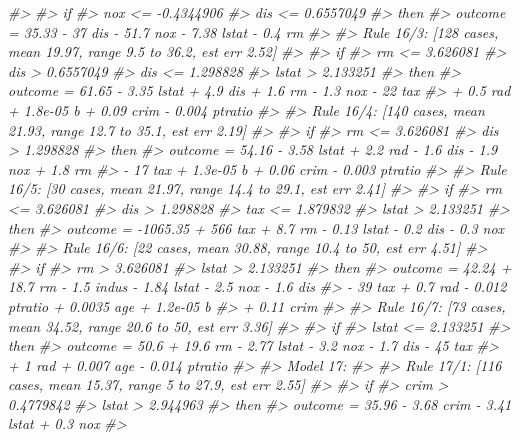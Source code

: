 \documentclass[]{book}
\newenvironment{Shaded}{\begin{snugshade}}{\end{snugshade}}
\newcommand{\CommentTok}[1]{\textcolor[rgb]{0.56,0.35,0.01}{\textit{#1}}}
\begin{document}
\begin{Shaded}
\begin{Highlighting}[]
\CommentTok{#> }
\CommentTok{#>     if}
\CommentTok{#>  nox <= -0.4344906}
\CommentTok{#>  dis <= 0.6557049}
\CommentTok{#>     then}
\CommentTok{#>  outcome = 35.33 - 37 dis - 51.7 nox - 7.38 lstat - 0.4 rm}
\CommentTok{#> }
\CommentTok{#>   Rule 16/3: [128 cases, mean 19.97, range 9.5 to 36.2, est err 2.52]}
\CommentTok{#> }
\CommentTok{#>     if}
\CommentTok{#>  rm <= 3.626081}
\CommentTok{#>  dis > 0.6557049}
\CommentTok{#>  dis <= 1.298828}
\CommentTok{#>  lstat > 2.133251}
\CommentTok{#>     then}
\CommentTok{#>  outcome = 61.65 - 3.35 lstat + 4.9 dis + 1.6 rm - 1.3 nox - 22 tax}
\CommentTok{#>            + 0.5 rad + 1.8e-05 b + 0.09 crim - 0.004 ptratio}
\CommentTok{#> }
\CommentTok{#>   Rule 16/4: [140 cases, mean 21.93, range 12.7 to 35.1, est err 2.19]}
\CommentTok{#> }
\CommentTok{#>     if}
\CommentTok{#>  rm <= 3.626081}
\CommentTok{#>  dis > 1.298828}
\CommentTok{#>     then}
\CommentTok{#>  outcome = 54.16 - 3.58 lstat + 2.2 rad - 1.6 dis - 1.9 nox + 1.8 rm}
\CommentTok{#>            - 17 tax + 1.3e-05 b + 0.06 crim - 0.003 ptratio}
\CommentTok{#> }
\CommentTok{#>   Rule 16/5: [30 cases, mean 21.97, range 14.4 to 29.1, est err 2.41]}
\CommentTok{#> }
\CommentTok{#>     if}
\CommentTok{#>  rm <= 3.626081}
\CommentTok{#>  dis > 1.298828}
\CommentTok{#>  tax <= 1.879832}
\CommentTok{#>  lstat > 2.133251}
\CommentTok{#>     then}
\CommentTok{#>  outcome = -1065.35 + 566 tax + 8.7 rm - 0.13 lstat - 0.2 dis - 0.3 nox}
\CommentTok{#> }
\CommentTok{#>   Rule 16/6: [22 cases, mean 30.88, range 10.4 to 50, est err 4.51]}
\CommentTok{#> }
\CommentTok{#>     if}
\CommentTok{#>  rm > 3.626081}
\CommentTok{#>  lstat > 2.133251}
\CommentTok{#>     then}
\CommentTok{#>  outcome = 42.24 + 18.7 rm - 1.5 indus - 1.84 lstat - 2.5 nox - 1.6 dis}
\CommentTok{#>            - 39 tax + 0.7 rad - 0.012 ptratio + 0.0035 age + 1.2e-05 b}
\CommentTok{#>            + 0.11 crim}
\CommentTok{#> }
\CommentTok{#>   Rule 16/7: [73 cases, mean 34.52, range 20.6 to 50, est err 3.36]}
\CommentTok{#> }
\CommentTok{#>     if}
\CommentTok{#>  lstat <= 2.133251}
\CommentTok{#>     then}
\CommentTok{#>  outcome = 50.6 + 19.6 rm - 2.77 lstat - 3.2 nox - 1.7 dis - 45 tax}
\CommentTok{#>            + 1 rad + 0.007 age - 0.014 ptratio}
\CommentTok{#> }
\CommentTok{#> Model 17:}
\CommentTok{#> }
\CommentTok{#>   Rule 17/1: [116 cases, mean 15.37, range 5 to 27.9, est err 2.55]}
\CommentTok{#> }
\CommentTok{#>     if}
\CommentTok{#>  crim > 0.4779842}
\CommentTok{#>  lstat > 2.944963}
\CommentTok{#>     then}
\CommentTok{#>  outcome = 35.96 - 3.68 crim - 3.41 lstat + 0.3 nox}
\CommentTok{#> }

\end{Highlighting}
\end{Shaded}
\end{document}

